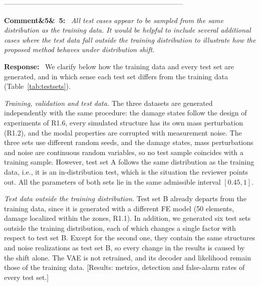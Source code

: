 \documentclass[11pt]{article}
\newenvironment{rcomment}[1]{\par\bigskip\noindent\textbf{Comment\ifx&#1&\else\ #1\fi:}\ \itshape}{\par}
\newenvironment{response}{\par\smallskip\noindent\color{resp}\textbf{Response:}\ }{\par}
\newcommand{\tbd}[1]{\textcolor{note}{\textsf{[#1]}}}
\begin{document}
 -----------------------------------------------------------------------------
\begin{rcomment}{5}
All test cases appear to be sampled from the same distribution as the training data. It would be helpful to include several additional cases where the test data fall outside the training distribution to illustrate how the proposed method behaves under distribution shift.
\end{rcomment}

\begin{response}
We clarify below how the training data and every test set are generated, and in which sense each test set differs from
the training data (Table~\ref{tab:testsets}).

\textit{Training, validation and test data.} The three datasets are generated independently with the same procedure: the
damage states follow the design of experiments of R1.6, every simulated structure has its own mass perturbation (R1.2), and
the modal properties are corrupted with measurement noise. The three sets use different random seeds, and the damage
states, mass perturbations and noise are continuous random variables, so no test sample coincides with a training
sample. However, test set A follows the same distribution as the training data, i.e., it is an in-distribution test,
which is the situation the reviewer points out. All the parameters of both sets lie in the same admissible interval
$[0.45,1]$.

\textit{Test data outside the training distribution.} Test set B already departs from the training data, since it is
generated with a different FE model (50 elements, damage localized within the zones, R1.1). In addition, we generated six
test sets outside the training distribution, each of which changes a single factor with respect to test set B. Except for
the second one, they contain the same structures and noise realizations as test set B, so every change in the results is
caused by the shift alone. The VAE is not retrained, and its decoder and likelihood remain those of the training data.
\tbd{Results: metrics, detection and false-alarm rates of every test set.}
\end{response}
\end{document}
